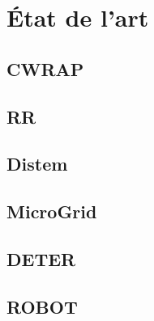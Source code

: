 \section{État de l'art}
\label{section:sota}
\subsection{CWRAP}

\subsection{RR}

\subsection{Distem}

\subsection{MicroGrid}
\subsection{DETER}
\subsection{ROBOT}
